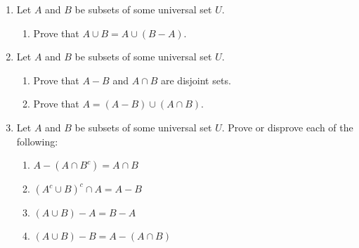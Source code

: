 \begin{enumerate}
\item Let  $A$  and  $B$  be subsets of some universal set  $U$\!. 
\label{exer:sec43-7}%
\begin{enumerate}
  \yitem Prove that  $A$  and  $B - A$ are disjoint sets.
  \item Prove that  $A \cup B = A \cup \left( {B - A} \right)$.
\end{enumerate}

\item Let  $A$  and  $B$  be subsets of some universal set  $U$. \label{exer:sec43-8}
\begin{enumerate}
  \item Prove that  $A - B$ and  $A \cap B$ are disjoint sets.
  \item Prove that  $A = \left( {A - B} \right) \cup \left( {A \cap B} \right)$.
\end{enumerate}

\item Let $A$ and $B$ be subsets of some universal set $U$\!.  Prove or disprove each of the following:


\begin{enumerate}
\item $A - \left(A \cap B^c \right) = A \cap B$
\item $\left( A^c \cup B \right)^c \cap A = A - B$
\item $\left( A \cup B \right) - A = B - A$
\item $\left( A \cup B \right) - B = A - \left( A \cap B \right)$
\end{enumerate}



\end{enumerate}

